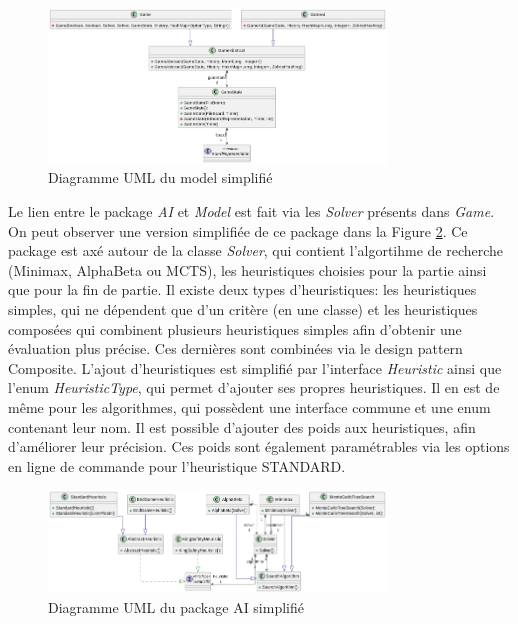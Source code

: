\documentclass{article}
\begin{document}
\begin{figure}[h]
    \centering
    \includegraphics[width=0.8\textwidth]{uml_model}
    \caption{Diagramme UML du model simplifié}
    \label{umlModel}
\end{figure}
\FloatBarrier

Le lien entre le package \textit{AI} et \textit{Model} est fait via les \textit{Solver} présents dans \textit{Game}.
On peut observer une version simplifiée de ce package dans la Figure \ref{umlAi}. Ce package est axé autour de la classe
\textit{Solver}, qui contient l'algortihme de recherche (Minimax, AlphaBeta ou MCTS), les heuristiques choisies pour la partie ainsi que pour la fin de partie.
Il existe deux types d'heuristiques: les heuristiques simples, qui ne dépendent que d'un critère (en une classe) et les heuristiques composées qui combinent 
plusieurs heuristiques simples afin d'obtenir une évaluation plus précise. Ces dernières sont combinées via le design pattern Composite.
L'ajout d'heuristiques est simplifié par l'interface \textit{Heuristic} ainsi que l'enum \textit{HeuristicType}, qui permet d'ajouter ses propres heuristiques.
Il en est de même pour les algorithmes, qui possèdent une interface commune et une enum contenant leur nom.
Il est possible d'ajouter des poids aux heuristiques, afin d'améliorer leur précision. Ces poids sont également paramétrables via les
options en ligne de commande pour l'heuristique STANDARD.
\begin{figure}[h]
    \centering
    \includegraphics[width=0.8\textwidth]{uml_ai}
    \caption{Diagramme UML du package AI simplifié}
    \label{umlAi}
\end{figure}
\FloatBarrier
\end{document}
